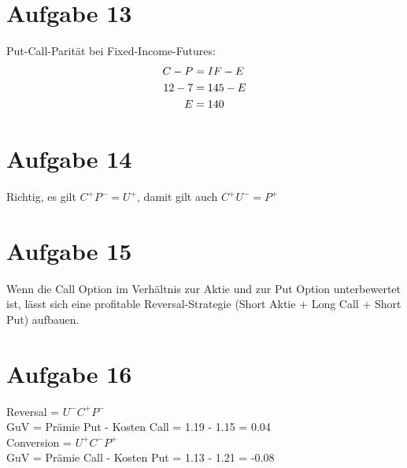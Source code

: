 \documentclass{article}
\begin{document}
	\section*{Aufgabe 13}
	Put-Call-Parität bei Fixed-Income-Futures:
	\begin{align}
		C-P &= IF - E \notag \\
		12 - 7 &= 145 - E \notag \\
		E &= 140 \notag
	\end{align}
	
	\section*{Aufgabe 14}
	Richtig, es gilt $C^+P^- = U^+$, damit gilt auch $C^+U^- = P^+$
	
	\section*{Aufgabe 15}
	Wenn die Call Option im Verhältnis zur Aktie und zur Put Option unterbewertet ist, lässt sich eine
	profitable Reversal-Strategie (Short Aktie + Long Call + Short Put) aufbauen.

	\section*{Aufgabe 16}
	Reversal = $U^-C^+P^-$ \\
	GuV = Prämie Put - Kosten Call = 1.19 - 1.15 = 0.04 \\
	Conversion = $U^+C^-P^+$ \\
	GuV = Prämie Call - Kosten Put = 1.13 - 1.21 = -0.08
	
	
\end{document}
